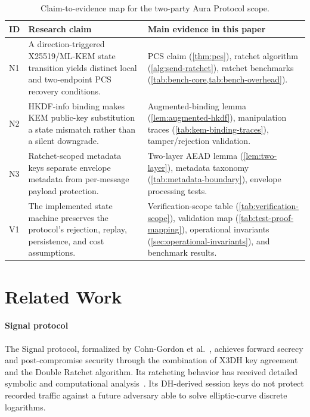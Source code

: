 \documentclass[preprint,12pt]{elsarticle}
\theoremstyle{definition}
\begin{document}
\begin{table}[H]
\centering
\caption{Claim-to-evidence map for the two-party Aura Protocol scope.}
\label{tab:contribution-map}
\footnotesize
\setlength{\tabcolsep}{2pt}
\begin{tabularx}{\textwidth}{@{}L{0.08\textwidth}L{0.28\textwidth}Y@{}}
\toprule
ID & Research claim & Main evidence in this paper \\
\midrule
N1 & A direction-triggered X25519/ML-KEM state transition yields distinct local and two-endpoint PCS recovery conditions. & PCS claim (\cref{thm:pcs}), ratchet algorithm (\cref{alg:send-ratchet}), ratchet benchmarks (\cref{tab:bench-core,tab:bench-overhead}). \\
N2 & HKDF-info binding makes KEM public-key substitution a state mismatch rather than a silent downgrade. & Augmented-binding lemma (\cref{lem:augmented-hkdf}), manipulation traces (\cref{tab:kem-binding-traces}), tamper/rejection validation. \\
N3 & Ratchet-scoped metadata keys separate envelope metadata from per-message payload protection. & Two-layer AEAD lemma (\cref{lem:two-layer}), metadata taxonomy (\cref{tab:metadata-boundary}), envelope processing tests. \\
V1 & The implemented state machine preserves the protocol's rejection, replay, persistence, and cost assumptions. & Verification-scope table (\cref{tab:verification-scope}), validation map (\cref{tab:test-proof-mapping}), operational invariants (\cref{sec:operational-invariants}), and benchmark results. \\
\bottomrule
\end{tabularx}
\end{table}

\section{Related Work}\label{sec:related}

\paragraph{Signal protocol}
The Signal protocol, formalized by Cohn-Gordon et al.~\cite{cohn-gordon2020}, achieves forward secrecy and post-compromise security through the combination of X3DH key agreement~\cite{signal-x3dh} and the Double Ratchet algorithm. Its ratcheting behavior has received detailed symbolic and computational analysis~\cite{cohn-gordon2020,alwen2020,bienstock2020}. Its DH-derived session keys do not protect recorded traffic against a future adversary able to solve elliptic-curve discrete logarithms.
\end{document}
